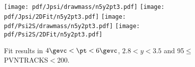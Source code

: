 \begin{figure}[H]
\begin{center}
\texttt{[image: pdf/Jpsi/drawmass/n5y2pt3.pdf]}
\texttt{[image: pdf/Jpsi/2DFit/n5y2pt3.pdf]}
\vspace*{-0.5cm}
\texttt{[image: pdf/Psi2S/drawmass/n5y2pt3.pdf]}
\texttt{[image: pdf/Psi2S/2DFit/n5y2pt3.pdf]}
\vspace*{-0.5cm}
\end{center}
\caption{Fit results in $4\gevc<\pt<6\gevc$, $2.8<y<3.5$ and 95$\leq$PVNTRACKS$<$200.}
\label{Fitn5y2pt3}
\end{figure}
